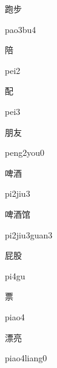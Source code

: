 \begin{verbete}[pao3bu4]{跑步}
\begin{pronuncia}{pao3bu4}
\end{pronuncia}
\end{verbete}

\begin{verbete}[pei2]{陪}
\begin{pronuncia}{pei2}
\end{pronuncia}
\end{verbete}

\begin{verbete}[pei3]{配}
\begin{pronuncia}{pei3}
\end{pronuncia}
\end{verbete}

\begin{verbete}{朋友}
\begin{pronuncia}{peng2you0}
\end{pronuncia}
\end{verbete}

\begin{verbete}[pi2jiu3]{啤酒}
\begin{pronuncia}{pi2jiu3}
\end{pronuncia}
\end{verbete}

\begin{verbete}{啤酒馆}
\begin{pronuncia}{pi2jiu3guan3}
\end{pronuncia}
\end{verbete}

\begin{verbete}[pi4gu]{屁股}
\begin{pronuncia}{pi4gu}
\end{pronuncia}
\end{verbete}

\begin{verbete}[piao4]{票}
\begin{pronuncia}{piao4}
\end{pronuncia}
\end{verbete}

\begin{verbete}{漂亮}
\begin{pronuncia}{piao4liang0}
\end{pronuncia}
\end{verbete}

